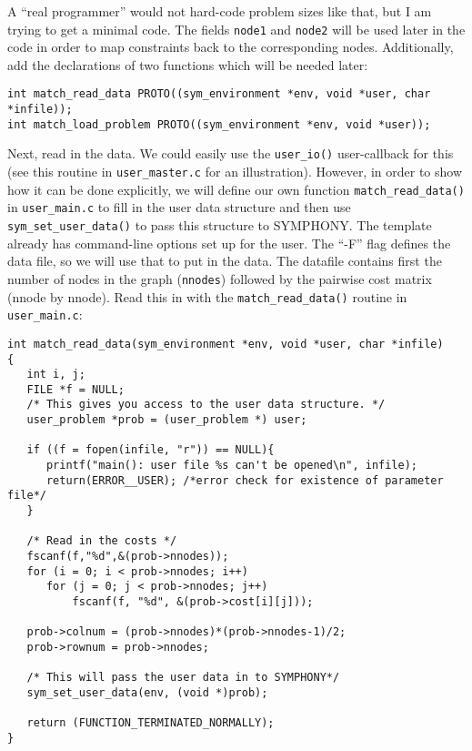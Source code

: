 \documentclass[11pt]{article}
\begin{document}
A ``real programmer'' would not hard-code problem sizes like that, but I am
trying to get a minimal code. The fields \texttt{node1} and \texttt{node2} will
be used later in the code in order to map constraints back to the
corresponding nodes. Additionally, add the declarations of two functions which 
will be needed later: 

\begin{verbatim}
int match_read_data PROTO((sym_environment *env, void *user, char *infile));
int match_load_problem PROTO((sym_environment *env, void *user));
\end{verbatim}

Next, read in the data. We could easily use the \texttt{user\_io()}
user-callback for this (see this routine in \texttt{user\_master.c} for an
illustration). However, in order to show how it can be done explicitly, we
will define our own function \texttt{match\_read\_data()} in
\texttt{user\_main.c} to fill in the user data structure and then use
\texttt{sym\_set\_user\_data()} to pass this structure to SYMPHONY. The
template already has command-line options set up for the user. The ``-F'' flag
defines the data file, so we will use that to put in the data. The datafile
contains first the number of nodes in the graph (\texttt{nnodes}) followed by
the pairwise cost matrix (nnode by nnode).  Read this in with the
\texttt{match\_read\_data()} routine in \texttt{user\_main.c}:

\begin{verbatim}
int match_read_data(sym_environment *env, void *user, char *infile)
{
   int i, j;
   FILE *f = NULL;
   /* This gives you access to the user data structure. */
   user_problem *prob = (user_problem *) user;

   if ((f = fopen(infile, "r")) == NULL){
      printf("main(): user file %s can't be opened\n", infile);
      return(ERROR__USER); /*error check for existence of parameter file*/
   }

   /* Read in the costs */
   fscanf(f,"%d",&(prob->nnodes));
   for (i = 0; i < prob->nnodes; i++)
      for (j = 0; j < prob->nnodes; j++)
          fscanf(f, "%d", &(prob->cost[i][j]));
   
   prob->colnum = (prob->nnodes)*(prob->nnodes-1)/2;
   prob->rownum = prob->nnodes;

   /* This will pass the user data in to SYMPHONY*/
   sym_set_user_data(env, (void *)prob);

   return (FUNCTION_TERMINATED_NORMALLY);
}
\end{verbatim}   
\end{document}
